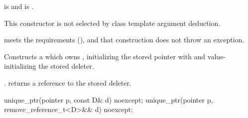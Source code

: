 \begin{itemdescr}
\pnum
\constraints
{} is  and
 is .

\pnum
\mandates
This constructor is not selected by
class template argument deduction.

\pnum
\expects
{} meets the  requirements (),
and that construction does not throw an exception.

\pnum
\effects
Constructs a  which owns
, initializing the stored pointer with  and
value-initializing the stored deleter.

\pnum
\ensures
{}. 
returns a reference to the stored deleter.
\end{itemdescr}

%
\begin{itemdecl}
unique_ptr(pointer p, const D& d) noexcept;
unique_ptr(pointer p, remove_reference_t<D>&& d) noexcept;
\end{itemdecl}

